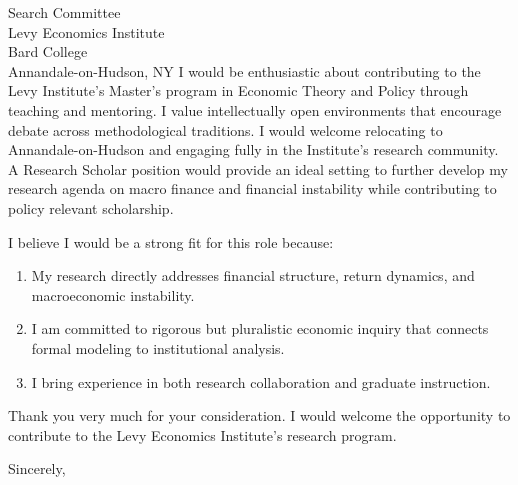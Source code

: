 \documentclass[11pt,letterpaper]{letter}
\begin{document}
\begin{letter}{
Search Committee \\
Levy Economics Institute \\
Bard College \\
Annandale-on-Hudson, NY
}
I would be enthusiastic about contributing to the Levy Institute’s Master’s program in Economic Theory and Policy through teaching and mentoring. I value intellectually open environments that encourage debate across methodological traditions. I would welcome relocating to Annandale-on-Hudson and engaging fully in the Institute’s research community. A Research Scholar position would provide an ideal setting to further develop my research agenda on macro finance and financial instability while contributing to policy relevant scholarship.

I believe I would be a strong fit for this role because:
\begin{enumerate}
    \item My research directly addresses financial structure, return dynamics, and macroeconomic instability.
    \item I am committed to rigorous but pluralistic economic inquiry that connects formal modeling to institutional analysis.
    \item I bring experience in both research collaboration and graduate instruction.
\end{enumerate}

Thank you very much for your consideration. I would welcome the opportunity to contribute to the Levy Economics Institute’s research program.

\closing{Sincerely,}

\end{letter}
\end{document}
